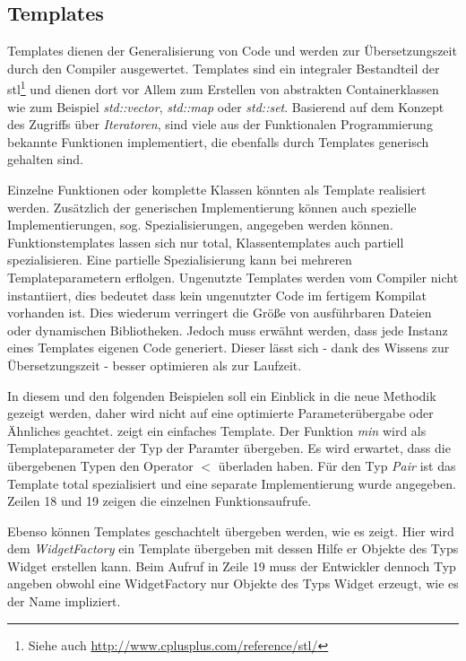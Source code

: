\subsection{Templates}
Templates dienen der Generalisierung von Code und werden zur Übersetzungszeit durch den Compiler ausgewertet. Templates sind ein integraler Bestandteil der \ac{stl}\footnote{Siehe auch \url{http://www.cplusplus.com/reference/stl/}} und dienen dort vor Allem zum Erstellen von abstrakten Containerklassen wie zum Beispiel \emph{std::vector}, \emph{std::map} oder \emph{std::set}. Basierend auf dem Konzept des Zugriffs über \emph{Iteratoren}, sind viele aus der Funktionalen Programmierung bekannte Funktionen implementiert, die ebenfalls durch Templates generisch gehalten sind.

Einzelne Funktionen oder komplette Klassen könnten als Template realisiert werden. Zusätzlich der generischen Implementierung können auch spezielle Implementierungen, sog. Spezialisierungen, angegeben werden können. Funktionstemplates lassen sich nur total, Klassentemplates auch partiell spezialisieren. Eine partielle Spezialisierung kann bei mehreren Templateparametern erflolgen. Ungenutzte Templates werden vom Compiler nicht instantiiert, dies bedeutet dass kein ungenutzter Code im fertigem Kompilat vorhanden ist. Dies wiederum verringert die Größe von ausführbaren Dateien oder dynamischen Bibliotheken. Jedoch muss erwähnt werden, dass jede Instanz eines Templates eigenen Code generiert. Dieser lässt sich - dank des Wissens zur Übersetzungszeit - besser optimieren als zur Laufzeit.

In diesem und den folgenden Beispielen soll ein Einblick in die neue Methodik gezeigt werden, daher wird nicht auf eine optimierte Parameterübergabe oder Ähnliches geachtet.  zeigt ein einfaches Template. Der Funktion \emph{min} wird als Templateparameter der Typ der Paramter übergeben. Es wird erwartet, dass die übergebenen Typen den Operator $<$ überladen haben. Für den Typ \emph{Pair} ist das Template total spezialisiert und eine separate Implementierung wurde angegeben. Zeilen 18 und 19 zeigen die einzelnen Funktionsaufrufe.



Ebenso können Templates geschachtelt übergeben werden, wie es  zeigt. Hier wird dem \emph{WidgetFactory} ein Template übergeben mit dessen Hilfe er Objekte des Typs Widget erstellen kann. Beim Aufruf in Zeile 19 muss der Entwickler dennoch Typ angeben obwohl eine WidgetFactory nur Objekte des Typs Widget erzeugt, wie es der Name impliziert.

